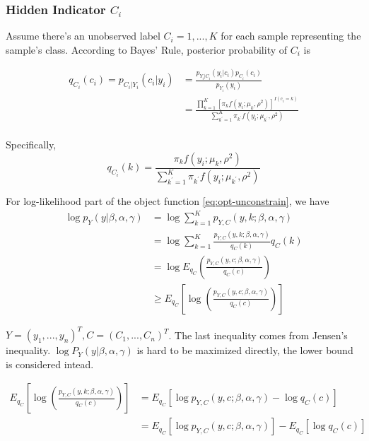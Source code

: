 \documentclass[12pt, a4paper, oneside]{article}
\numberwithin{equation}{section}
\begin{document}
\subsubsection{Hidden Indicator $C_i$}
\label{subsubsec:hidden-indicator}

Assume there's an unobserved label $C_i = 1,...,K$ for each sample representing the sample's class. According to Bayes' Rule, posterior probability of $C_i$ is

\begin{equation}
\label{eq:qc}
\begin{aligned}
q_{C_i}(c_i) = p_{C_i|Y_i}(c_i|y_i) &= \frac{p_{Y_i|C_i}(y_i|c_i)p_{C_i}(c_i)}{p_{Y_i}(y_i)} \\
&= \frac{\displaystyle\prod_{k=1}^K\left[\pi_k f(y_i;\mu_k, \rho^2)\right]^{I(c_i=k)}}{\displaystyle\sum_{k^\prime=1}^{K}\pi_{k^\prime} f(y_i;\mu_{k^\prime}, \rho^2)} \\ 
\end{aligned}
\end{equation}

Specifically, 
\begin{equation}
q_{C_i}(k) = \frac{\pi_k f(y_i;\mu_k, \rho^2)}{\displaystyle\sum_{k^\prime=1}^{K}\pi_{k^\prime} f(y_i;\mu_{k^\prime}, \rho^2)}
\end{equation}

For log-likelihood part of the object function \ref{eq:opt-unconstrain}, we have
\begin{equation}
\label{eq:ob-loglikelihood}
\begin{aligned}
\log{p_Y(y|\beta, \alpha, \gamma)} 
&= \log{\sum_{k = 1}^{K} p_{Y, C}(y, k; \beta, \alpha, \gamma)} \\
&= \log{\sum_{k = 1}^{K}\frac{ p_{Y, C}(y, k; \beta, \alpha, \gamma)}{q_C(k)}q_C(k)} \\
&= \log{E_{q_C}\left(\frac{ p_{Y, C}(y, c; \beta, \alpha, \gamma)}{q_C(c)}\right)} \\
&\geq E_{q_C}\left[\log{\left(\frac{ p_{Y, C}(y, c; \beta, \alpha, \gamma)}{q_C(c)}\right)}\right]
\end{aligned}
\end{equation}

$Y = (y_1,...,y_n)^T, C = (C_1,...,C_n)^T$. The last inequality comes from Jensen's inequality. $\log{P_Y(y|\beta, \alpha, \gamma)} $ is hard to be maximized directly, the lower bound is considered intead. 

\begin{equation}
\label{eq:lower-bound-1}
\begin{aligned}
E_{q_C}\left[\log{\left(\frac{ p_{Y, C}(y, k; \beta, \alpha, \gamma)}{q_C(c)}\right)}\right]
&= E_{q_C}\left[\log{p_{Y, C}(y, c; \beta, \alpha, \gamma)} - \log{q_C(c)}\right] \\
&= E_{q_C}\left[\log{p_{Y, C}(y, c; \beta, \alpha, \gamma)}\right] - E_{q_C}\left[\log{q_C(c)}\right] \\
\end{aligned}
\end{equation}
\end{document}
